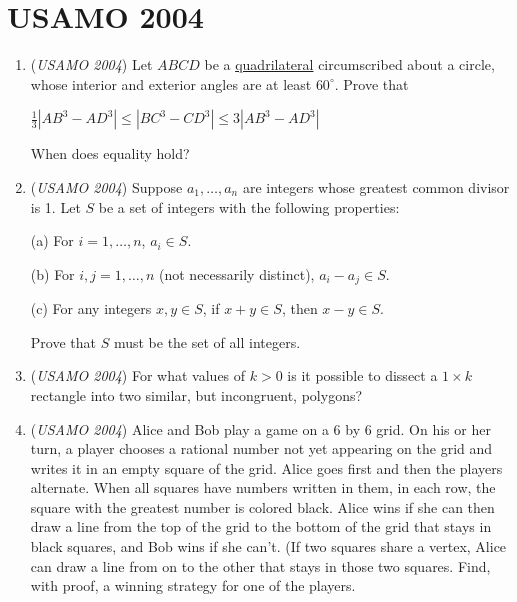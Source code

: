\section{USAMO 2004}
        \begin{enumerate}
        	\item (\textit{USAMO 2004}) Let $ABCD$ be a \href{https://artofproblemsolving.com/wiki/index.php?title=Quadrilateral}{quadrilateral} circumscribed about a circle, whose interior and exterior angles are at least $60 ^{\circ}$.  Prove that


 
$\frac{1}{3} | AB^3 - AD^3 | \le | BC^3 - CD^3 | \le 3 |AB^3 - AD^3 |$


 


 When does equality hold?


 

	\item (\textit{USAMO 2004}) Suppose $a_1, \ldots, a_n$ are integers whose greatest common divisor is 1.  Let $S$ be a set of integers with the following properties:


 (a) For $i = 1, \ldots , n$, $a_i \in S$. 

(b) For $i, j = 1, \ldots, n$ (not necessarily distinct), $a_i - a_j \in S$. 

(c) For any integers $x, y \in S$, if $x+y \in S$, then $x-y \in S$.


 Prove that $S$ must be the set of all integers.


 

	\item (\textit{USAMO 2004}) For what values of $k > 0$ is it possible to dissect a $1 \times k$ rectangle into two similar, but incongruent, polygons?


 

	\item (\textit{USAMO 2004}) Alice and Bob play a game on a 6 by 6 grid.  On his or her turn, a player chooses a rational number not yet appearing on the grid and writes it in an empty square of the grid.  Alice goes first and then the players alternate.  When all squares have numbers written in them, in each row, the square with the greatest number is colored black.  Alice wins if she can then draw a line from the top of the grid to the bottom of the grid that stays in black squares, and Bob wins if she can't.  (If two squares share a vertex, Alice can draw a line from on to the other that stays in those two squares.  Find, with proof, a winning strategy for one of the players.



\end{enumerate}
